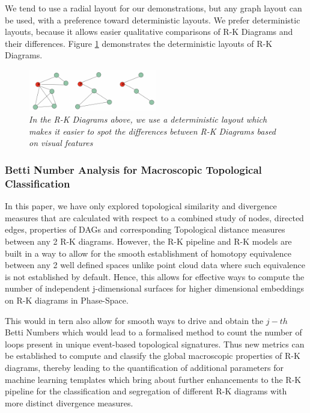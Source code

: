 We tend to use a radial layout for our demonstrations, but any graph layout can be used, with a preference toward deterministic layouts. We prefer deterministic layouts, because it allows easier qualitative comparisons of R-K Diagrams and their differences. Figure \ref{fig:layouts} demonstrates the deterministic layouts of R-K Diagrams. 

\begin{figure}
	\centering
        \includegraphics[width=0.5\textwidth]{images/rk-diagram-layouts.png}
	\caption{\textit{In the R-K Diagrams above, we use a deterministic layout which makes it easier to spot the differences between R-K Diagrams based on visual features}}
	\label{fig:layouts}
\end{figure}

\subsubsection{Betti Number Analysis for Macroscopic Topological Classification}
\label{sec:BettiNumber}
In this paper, we have only explored topological similarity and divergence measures that are calculated with respect to a combined study of nodes, directed edges, properties of DAGs and corresponding Topological distance measures between any 2 R-K diagrams. However, the R-K pipeline and R-K models are built in a way to allow for the smooth establishment of homotopy equivalence between any 2 well defined spaces unlike point cloud data where such equivalence is not established by default. Hence, this allows for effective ways to compute the number of independent j-dimensional surfaces for higher dimensional embeddings on R-K diagrams in Phase-Space. 

This would in tern also allow for smooth ways to drive and obtain the $j-th$ Betti Numbers which would lead to a formalised method to count the number of loops present in unique event-based topological signatures. Thus new metrics can be established to compute and classify the global macroscopic properties of R-K diagrams, thereby leading to the quantification of additional parameters for machine learning templates which bring about further enhancements to the R-K pipeline for the classification and segregation of different R-K diagrams with more distinct divergence measures.
 
